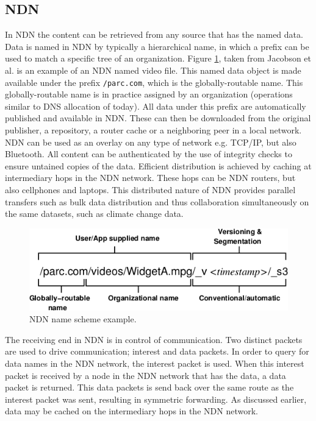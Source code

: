 

\subsection{NDN}
\label{overview-ndn}
In NDN the content can be retrieved from any source that has the named data. Data is named in NDN by typically a hierarchical name, in which a prefix can be used to match a specific tree of an organization.  Figure \ref{fig:ndn_name}, taken from Jacobson et al. \cite{jacobson2009networking} is an example of an NDN named video file. This named data object is made available under the prefix \texttt{/parc.com}, which is the globally-routable name. This globally-routable name is in practice assigned by an organization (operations similar to DNS allocation of today). All data under this prefix are automatically published and available in NDN. These can then be downloaded from the original publisher, a repository, a router cache or a neighboring peer in a local network. NDN can be used as an overlay on any type of network e.g. TCP/IP, but also Bluetooth. All content can be authenticated by the use of integrity checks to ensure untained copies of the data. Efficient distribution is achieved by caching at intermediary hops in the NDN network. These hops can be NDN routers, but also cellphones and laptops. This distributed nature of NDN provides parallel transfers such as bulk data distribution and thus collaboration simultaneously on the same datasets, such as climate change data.

\begin{figure}[H]
\centering
\includegraphics[width=\columnwidth/2]{Images/ndn_name.png}
\caption{NDN name scheme example.}
\label{fig:ndn_name}
\end{figure}

The receiving end in NDN is in control of communication. Two distinct packets are used to drive communication; interest and data packets. In order to query for data names in the NDN network, the interest packet is used. When this interest packet is received by a node in the NDN network that has the data, a data packet is returned. This data packets is send back over the same route as the interest packet was sent, resulting in symmetric forwarding. As discussed earlier, data may be cached on the intermediary hops in the NDN network.

